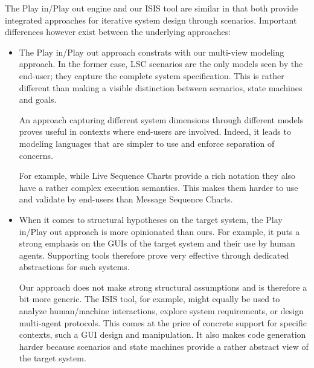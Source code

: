 The Play in/Play out engine and our ISIS tool are similar in that both provide integrated approaches for iterative system design through scenarios. Important differences however exist between the underlying approaches:
\begin{itemize}
\item The Play in/Play out approach constrats with our multi-view modeling approach. In the former case, LSC scenarios are the only models seen by the end-user; they capture the complete system specification. This is rather different than making a visible distinction between scenarios, state machines and goals. 

An approach capturing different system dimensions through different models proves useful in contexts where end-users are involved. Indeed, it leads to modeling languages that are simpler to use and enforce separation of concerns. 

For example, while Live Sequence Charts provide a rich notation they also have a rather complex execution semantics. This makes them harder to use and validate by end-users than Message Sequence Charts.

\item When it comes to structural hypotheses on the target system, the Play in/Play out approach is more opinionated than ours. For example, it puts a strong emphasis on the GUIs of the target system and their use by human agents. Supporting tools therefore prove very effective through dedicated abstractions for such systems.

Our approach does not make strong structural assumptions and is therefore a bit more generic. The ISIS tool, for example, might equally be used to analyze human/machine interactions, explore system requirements, or design multi-agent protocols. This comes at the price of concrete support for specific contexts, such a GUI design and manipulation. It also makes code generation harder because scenarios and state machines provide a rather abstract view of the target system.
\end{itemize}

